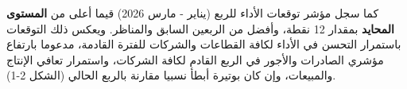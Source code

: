 كما سجل مؤشر توقعات الأداء للربع (يناير - مارس 2026) قيما أعلى من \textbf{المستوى المحايد} بمقدار 12 نقطة، وأفضل من الربعين السابق والمناظر. ويعكس ذلك التوقعات باستمرار التحسن في الأداء لكافة القطاعات والشركات للفترة القادمة، مدعوما بارتفاع مؤشري الصادرات والأجور في الربع القادم لكافة الشركات، واستمرار تعافي الإنتاج والمبيعات، وإن كان بوتيرة أبطأ نسبيا مقارنة بالربع الحالي (الشكل 2-1).
